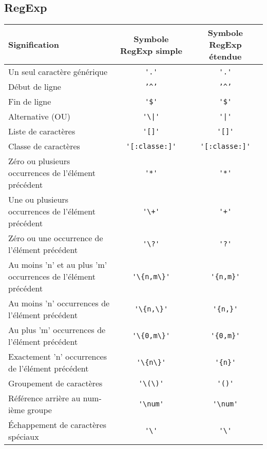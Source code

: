 \documentclass[11pt,a4paper]{article}
\begin{document}
\subsection{RegExp}

\bigskip


\begin{center}
	\begin{tabular}{ M{5cm} | c | c }
	\textbf{Signification} & \textbf{Symbole RegExp simple} & \textbf{Symbole RegExp étendue} \\  \hline
	Un seul caractère générique & \verb!'.'! & \verb!'.'! \\ \hline
	Début de ligne & \texttt{'\^{}'} & \texttt{'\^{}'} \\ \hline
	Fin de ligne & \verb!'$'! & \verb!'$'! \\ \hline
	Alternative (OU) & \verb!'\|'! & \verb!'|'! \\ \hline
	Liste de caractères & \verb!'[]'! & \verb!'[]'! \\ \hline
	Classe de caractères & \verb!'[:classe:]'! & \verb!'[:classe:]'! \\ \hline
	Zéro ou plusieurs occurrences de l'élément précédent & \verb!'*'! & \verb!'*'! \\ \hline
	Une ou plusieurs occurrences de l'élément précédent & \verb!'\+'! & \verb!'+'! \\ \hline
	Zéro ou une occurrence de l'élément précédent & \verb!'\?'! & \verb!'?'! \\ \hline
	Au moins 'n' et au plus 'm' occurrences de l'élément précédent & \verb!'\{n,m\}'! & \verb!'{n,m}'! \\ \hline
	Au moins 'n' occurrences de l'élément précédent & \verb!'\{n,\}'! & \verb!'{n,}'! \\ \hline
	Au plus 'm' occurrences de l'élément précédent & \verb!'\{0,m\}'! & \verb!'{0,m}'! \\ \hline
	Exactement 'n' occurrences de l'élément précédent & \verb!'\{n\}'! & \verb!'{n}'! \\ \hline
	Groupement de caractères & \verb!'\(\)'! & \verb!'()'! \\ \hline
	Référence arrière au num-ième groupe & \verb!'\num'! & \verb!'\num'! \\ \hline
	\'Echappement de caractères spéciaux & \verb!'\'! & \verb!'\'!
	\end{tabular}
\end{center}

\end{document}
